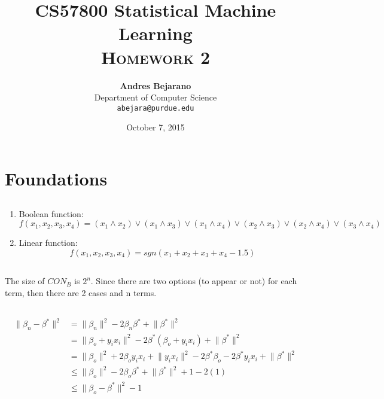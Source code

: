 \documentclass[11pt]{article}
\title{
\textbf{CS57800 Statistical Machine Learning} \\ \textsc{Homework 2} \\
\normalsize\vspace{0.1in}
}
\author{
	\textbf{Andres Bejarano} \\
	Department of Computer Science\\
	\texttt{abejara@purdue.edu}
}
\date{October 7, 2015}
\begin{document}
\maketitle

\section{Foundations}


\subsection{}

\begin{enumerate}
\item Boolean function:
$$f(x_1, x_2, x_3, x_4) = (x_1 \land x_2) \lor (x_1 \land x_3) \lor (x_1 \land x_4) \lor (x_2 \land x_3) \lor (x_2 \land x_4) \lor (x_3 \land x_4)$$

\item Linear function:
$$f(x_1, x_2, x_3, x_4) = sgn(x_1 + x_2 + x_3 + x_4 - 1.5)$$

\end{enumerate}


\subsection{}

The size of $CON_B$ is $2^n$. Since there are two options (to appear or not) for each term, then there are 2 cases and n terms.


\subsection{}

\begin{align*} 
\lVert \beta_n - \beta^* \rVert ^ 2 &= \lVert \beta_n \rVert ^ 2 - 2 \beta_n \beta^* + \lVert \beta^* \rVert ^ 2\\
&= \lVert \beta_o + y_ix_i \rVert ^ 2 - 2 \beta^*(\beta_o + y_ix_i) + \lVert \beta^* \rVert ^ 2\\
&= \lVert \beta_o \rVert ^ 2 + 2\beta_o y_ix_i + \lVert y_ix_i \rVert ^ 2 - 2\beta^*\beta_o - 2\beta^*y_ix_i + \lVert \beta^* \rVert ^ 2\\
&\leq \lVert \beta_o \rVert ^ 2 - 2\beta_o\beta^* + \lVert \beta^* \rVert ^ 2 + 1 - 2(1) \\
&\leq \lVert \beta_o - \beta^* \rVert ^ 2 - 1
\end{align*}
\end{document}
